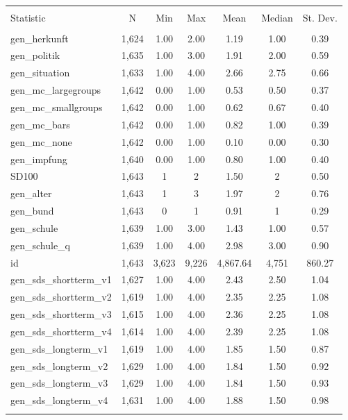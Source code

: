 
\begin{table}[!htbp] \centering 
  \caption{} 
  \label{} 
\begin{tabular}{@{\extracolsep{5pt}}lcccccc} 
\\[-1.8ex]\hline 
\hline \\[-1.8ex] 
Statistic & \multicolumn{1}{c}{N} & \multicolumn{1}{c}{Min} & \multicolumn{1}{c}{Max} & \multicolumn{1}{c}{Mean} & \multicolumn{1}{c}{Median} & \multicolumn{1}{c}{St. Dev.} \\ 
\hline \\[-1.8ex] 
gen\_herkunft & 1,624 & 1.00 & 2.00 & 1.19 & 1.00 & 0.39 \\ 
gen\_politik & 1,635 & 1.00 & 3.00 & 1.91 & 2.00 & 0.59 \\ 
gen\_situation & 1,633 & 1.00 & 4.00 & 2.66 & 2.75 & 0.66 \\ 
gen\_mc\_largegroups & 1,642 & 0.00 & 1.00 & 0.53 & 0.50 & 0.37 \\ 
gen\_mc\_smallgroups & 1,642 & 0.00 & 1.00 & 0.62 & 0.67 & 0.40 \\ 
gen\_mc\_bars & 1,642 & 0.00 & 1.00 & 0.82 & 1.00 & 0.39 \\ 
gen\_mc\_none & 1,642 & 0.00 & 1.00 & 0.10 & 0.00 & 0.30 \\ 
gen\_impfung & 1,640 & 0.00 & 1.00 & 0.80 & 1.00 & 0.40 \\ 
SD100 & 1,643 & 1 & 2 & 1.50 & 2 & 0.50 \\ 
gen\_alter & 1,643 & 1 & 3 & 1.97 & 2 & 0.76 \\ 
gen\_bund & 1,643 & 0 & 1 & 0.91 & 1 & 0.29 \\ 
gen\_schule & 1,639 & 1.00 & 3.00 & 1.43 & 1.00 & 0.57 \\ 
gen\_schule\_q & 1,639 & 1.00 & 4.00 & 2.98 & 3.00 & 0.90 \\ 
id & 1,643 & 3,623 & 9,226 & 4,867.64 & 4,751 & 860.27 \\ 
gen\_sds\_shortterm\_v1 & 1,627 & 1.00 & 4.00 & 2.43 & 2.50 & 1.04 \\ 
gen\_sds\_shortterm\_v2 & 1,619 & 1.00 & 4.00 & 2.35 & 2.25 & 1.08 \\ 
gen\_sds\_shortterm\_v3 & 1,615 & 1.00 & 4.00 & 2.36 & 2.25 & 1.08 \\ 
gen\_sds\_shortterm\_v4 & 1,614 & 1.00 & 4.00 & 2.39 & 2.25 & 1.08 \\ 
gen\_sds\_longterm\_v1 & 1,619 & 1.00 & 4.00 & 1.85 & 1.50 & 0.87 \\ 
gen\_sds\_longterm\_v2 & 1,629 & 1.00 & 4.00 & 1.84 & 1.50 & 0.92 \\ 
gen\_sds\_longterm\_v3 & 1,629 & 1.00 & 4.00 & 1.84 & 1.50 & 0.93 \\ 
gen\_sds\_longterm\_v4 & 1,631 & 1.00 & 4.00 & 1.88 & 1.50 & 0.98 \\ 
\hline \\[-1.8ex] 
\end{tabular} 
\end{table} 
